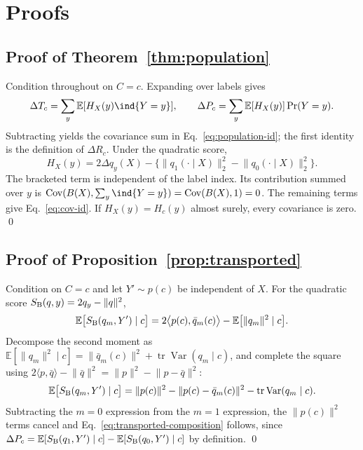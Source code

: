 \makeatletter
\appendix
\gdef\thesection{\@Alph\c@section}
\makeatother

\section{Proofs}\label{app:proofs}

\subsection{Proof of Theorem~\ref{thm:population}}
Condition throughout on $C=c$. Expanding over labels gives
\[
\Delta T_c=\sum_y\mathbb E[H_X(y)\ind \{Y=y\}],\qquad
\Delta P_c=\sum_y\mathbb E[H_X(y)]\Pr(Y=y).
\]
Subtracting yields the covariance sum in Eq.~\eqref{eq:population-id}; the first
identity is the definition of $\Delta R_c$. Under the quadratic score,
\[
H_X(y)=2\Delta q_y(X)-\{\lVert q_1(\cdot\mid X)\rVert_2^2-
\lVert q_0(\cdot\mid X)\rVert_2^2\}.
\]
The bracketed term is independent of the label index. Its contribution summed over $y$
is $\operatorname{Cov}(B(X),\sum_y\ind \{Y=y\})=
\operatorname{Cov}(B(X),1)=0$. The remaining terms give Eq.~\eqref{eq:cov-id}. If
$H_X(y)=H_c(y)$ almost surely, every covariance is zero. \qed

\subsection{Proof of Proposition~\ref{prop:transported}}
Condition on $C=c$ and let $Y'\sim p(c)$ be independent of $X$. For the quadratic score
$S_{\rm B}(q,y)=2q_y-\lVert q\rVert^2$,
\begin{equation}
\mathbb E\bigl[S_{\rm B}(q_m,Y')\mid c\bigr]
=2\bigl\langle p(c),\bar q_m(c)\bigr\rangle-\mathbb E\bigl[\lVert q_m\rVert^2\mid c\bigr].
\end{equation}
Decompose the second moment as
$\mathbb E[\lVert q_m\rVert^2\mid c]=\lVert\bar q_m(c)\rVert^2
+\operatorname{tr}\operatorname{Var}(q_m\mid c)$, and complete the square using
$2\langle p,\bar q\rangle-\lVert\bar q\rVert^2=\lVert p\rVert^2-\lVert p-\bar q\rVert^2$:
\begin{equation}
\mathbb E\bigl[S_{\rm B}(q_m,Y')\mid c\bigr]
=\lVert p(c)\rVert^2-\lVert p(c)-\bar q_m(c)\rVert^2
-\operatorname{tr}\operatorname{Var}(q_m\mid c).
\end{equation}
Subtracting the $m=0$ expression from the $m=1$ expression, the $\lVert p(c)\rVert^2$
terms cancel and Eq.~\eqref{eq:transported-composition} follows, since
$\Delta P_c=\mathbb E[S_{\rm B}(q_1,Y')\mid c]-\mathbb E[S_{\rm B}(q_0,Y')\mid c]$ by
definition. \qed

